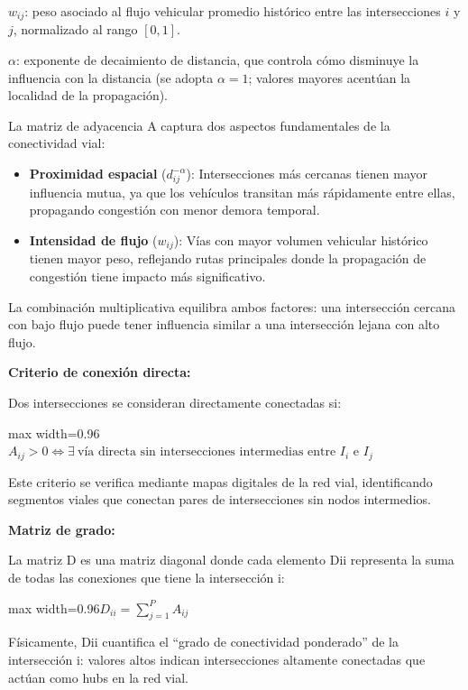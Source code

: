 \documentclass[12pt,a4paper,oneside]{report}
\newenvironment{centeredmath}
  {\begin{center}\begin{adjustbox}{max width=0.96\linewidth}\(\displaystyle}
  {\)\end{adjustbox}\end{center}}
\begin{document}
\(w_{ij}\): peso asociado al flujo vehicular promedio histórico entre las intersecciones \(i\) y \(j\), normalizado al rango \([0,1]\).

\(\alpha\): exponente de decaimiento de distancia, que controla cómo disminuye la influencia con la distancia (se adopta \(\alpha = 1\); valores mayores acentúan la localidad de la propagación).

La matriz de adyacencia A captura dos aspectos fundamentales de la conectividad vial:

\begin{itemize}
\item
  \textbf{Proximidad espacial} (\(d_{ij}^{- \alpha}\)): Intersecciones más cercanas tienen mayor influencia mutua, ya que los vehículos transitan más rápidamente entre ellas, propagando congestión con menor demora temporal.
\item
  \textbf{Intensidad de flujo} (\(w_{ij}\)): Vías con mayor volumen vehicular histórico tienen mayor peso, reflejando rutas principales donde la propagación de congestión tiene impacto más significativo.
\end{itemize}

La combinación multiplicativa equilibra ambos factores: una intersección cercana con bajo flujo puede tener influencia similar a una intersección lejana con alto flujo.

\textbf{Criterio de conexión directa:}

Dos intersecciones se consideran directamente conectadas si:

\begin{centeredmath}
A_{ij} > 0 \iff \exists\ \text{vía directa sin intersecciones intermedias entre } I_{i} \text{ e } I_{j}
\end{centeredmath}

Este criterio se verifica mediante mapas digitales de la red vial, identificando segmentos viales que conectan pares de intersecciones sin nodos intermedios.

\textbf{Matriz de grado:}

La matriz D es una matriz diagonal donde cada elemento Dii\hspace{0pt} representa la suma de todas las conexiones que tiene la intersección i:

\begin{centeredmath}
D_{ii} = \sum_{j = 1}^{P}A_{ij}
\end{centeredmath}

Físicamente, Dii cuantifica el ``grado de conectividad ponderado'' de la intersección i: valores altos indican intersecciones altamente conectadas que actúan como hubs en la red vial.
\end{document}
